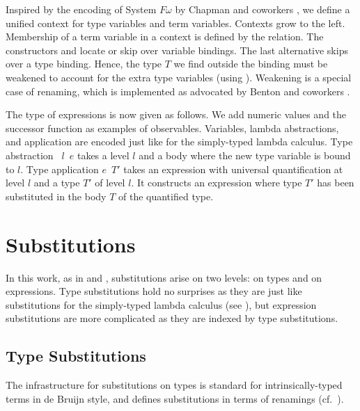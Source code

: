 \documentclass[acmsmall,anonymous,review,screen]{acmart}
\begin{document}
Inspired by the encoding of System $F\omega$ by Chapman and coworkers
\cite{DBLP:conf/mpc/ChapmanKNW19}, we define a 
unified context for type variables and term variables. Contexts grow to the left.
\TFTVEnv
Membership of a term variable in a context is defined by the
{\Ainn} relation.
\TFinn
The constructors {\Ahere} and {\Athere} locate or skip over variable bindings.
The last alternative {\Atskip} skips over a type binding. Hence, the type
$T$ we find outside the binding must be weakened to account for the
extra type variables (using {\ATwk}). Weakening is a special case of renaming, which
is implemented as advocated by Benton and coworkers \cite{DBLP:journals/jar/BentonHKM12}.

The type of expressions is now given as follows.
\TFExpr
We add numeric values and the successor function as examples of observables.
Variables, lambda abstractions, and application are encoded just like
for the simply-typed lambda calculus.
Type abstraction \texttt{ $l$  $e$} takes a level $l$ and a body where the new type
variable is bound to $l$. 
Type application \texttt{$e$  $T'$} takes an expression with universal quantification at
level $l$ and a type $T'$ of level $l$. It constructs an expression
where type $T'$ has been substituted in the body $T$ of the
quantified type.

\section{Substitutions}
\label{sec:substitutions}

In this work, as in \citet{DBLP:journals/jar/BentonHKM12} and
\citet{DBLP:conf/mpc/ChapmanKNW19}, substitutions arise on two levels:
on types and on expressions. Type substitutions hold no surprises as
they are just like substitutions for the simply-typed lambda calculus (see
\cite{DBLP:journals/scp/KokkeSW20}), but expression substitutions are
more complicated as they are indexed by type substitutions.

\subsection{Type Substitutions}
\label{sec:substitutions:type}

The infrastructure for substitutions on types is standard for
intrinsically-typed terms in de Bruijn
style, and defines substitutions in terms of renamings
(cf.~\cite{DBLP:journals/jar/BentonHKM12, DBLP:conf/mpc/ChapmanKNW19, DBLP:journals/scp/KokkeSW20}).
\end{document}
